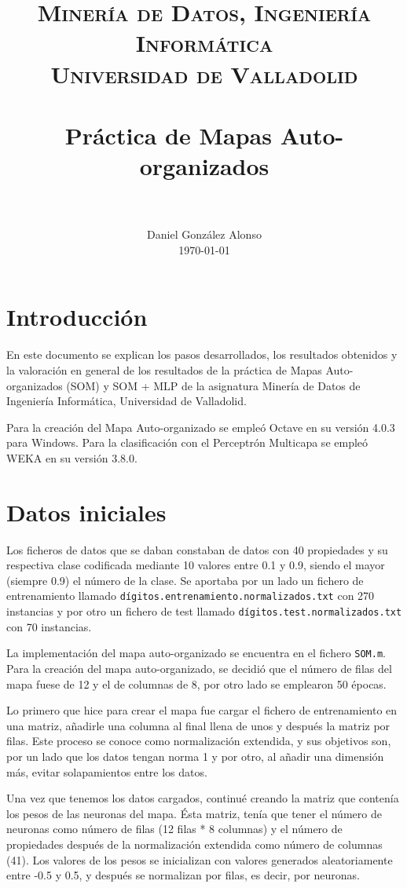 \documentclass[paper=a4, fontsize=12pt]{scrartcl}
\title{
		\usefont{OT1}{bch}{b}{n}
		\normalfont \normalsize \textsc{
        	Minería de Datos, Ingeniería Informática\\
	        Universidad de Valladolid
        } \\ [25pt]
		\horrule{1pt} \\[0.4cm]
		\LARGE \sc \textbf{Práctica de Mapas Auto-organizados} \\
		\horrule{1pt} \\[0.4cm]
}
\author{
		\normalfont 								\normalsize
        Daniel González Alonso\\[-3pt]		\normalsize
        \today
}
\date{}
\begin{document}
\maketitle


\section{Introducción}
En este documento se explican los pasos desarrollados, los resultados obtenidos y la valoración en general de los resultados de la práctica de Mapas Auto-organizados (SOM) y SOM + MLP de la asignatura Minería de Datos de Ingeniería Informática, Universidad de Valladolid.

Para la creación del Mapa Auto-organizado se empleó Octave en su versión 4.0.3 para Windows. Para la clasificación con el Perceptrón Multicapa se empleó WEKA en su versión 3.8.0.\\


\section{Datos iniciales}
Los ficheros de datos que se daban constaban de datos con 40 propiedades y su respectiva clase codificada mediante 10 valores entre 0.1 y 0.9, siendo el mayor (siempre 0.9) el número de la clase. Se aportaba por un lado un fichero de entrenamiento llamado \texttt{dígitos.entrenamiento.normalizados.txt} con 270 instancias y por otro un fichero de test llamado \texttt{dígitos.test.normalizados.txt} con 70 instancias.

La implementación del mapa auto-organizado se encuentra en el fichero \texttt{SOM.m}. Para la creación del mapa auto-organizado, se decidió que el número de filas del mapa fuese de 12 y el de columnas de 8, por otro lado se emplearon 50 épocas.

Lo primero que hice para crear el mapa fue cargar el fichero de entrenamiento en una matriz, añadirle una columna al final llena de unos y después la matriz por filas. Este proceso se conoce como normalización extendida, y sus objetivos son, por un lado que los datos tengan norma 1 y por otro, al añadir una dimensión más, evitar solapamientos entre los datos.

Una vez que tenemos los datos cargados, continué creando la matriz que contenía los pesos de las neuronas del mapa. Ésta matriz, tenía que tener el número de neuronas como número de filas (12 filas * 8 columnas) y el número de propiedades después de la normalización extendida como número de columnas (41). Los valores de los pesos se inicializan con valores generados aleatoriamente entre -0.5 y 0.5, y después se normalizan por filas, es decir, por neuronas.\\
\end{document}
